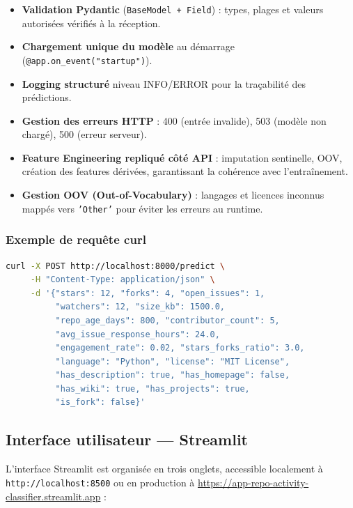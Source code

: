 \documentclass[12pt,a4paper]{article}
\begin{document}
\begin{itemize}[noitemsep]
  \item \textbf{Validation Pydantic} (\texttt{BaseModel + Field}) : types, plages et valeurs
    autorisées vérifiés à la réception.
  \item \textbf{Chargement unique du modèle} au démarrage (\texttt{@app.on\_event("startup")}).
  \item \textbf{Logging structuré} niveau INFO/ERROR pour la traçabilité des prédictions.
  \item \textbf{Gestion des erreurs HTTP} : 400 (entrée invalide), 503 (modèle non chargé),
    500 (erreur serveur).
  \item \textbf{Feature Engineering repliqué côté API} : imputation sentinelle, OOV, création
    des features dérivées, garantissant la cohérence avec l'entraînement.
  \item \textbf{Gestion OOV (Out-of-Vocabulary)} : langages et licences inconnus mappés vers
    \texttt{'Other'} pour éviter les erreurs au runtime.
\end{itemize}

\subsubsection{Exemple de requête curl}

\begin{lstlisting}[language=bash, caption={Appel curl à l'endpoint /predict}]
curl -X POST http://localhost:8000/predict \
     -H "Content-Type: application/json" \
     -d '{"stars": 12, "forks": 4, "open_issues": 1,
          "watchers": 12, "size_kb": 1500.0,
          "repo_age_days": 800, "contributor_count": 5,
          "avg_issue_response_hours": 24.0,
          "engagement_rate": 0.02, "stars_forks_ratio": 3.0,
          "language": "Python", "license": "MIT License",
          "has_description": true, "has_homepage": false,
          "has_wiki": true, "has_projects": true,
          "is_fork": false}'
\end{lstlisting}

\subsection{Interface utilisateur --- Streamlit}

L'interface Streamlit est organisée en trois onglets, accessible localement à
\texttt{http://localhost:8500} ou en production à
\url{https://app-repo-activity-classifier.streamlit.app} :
\end{document}

